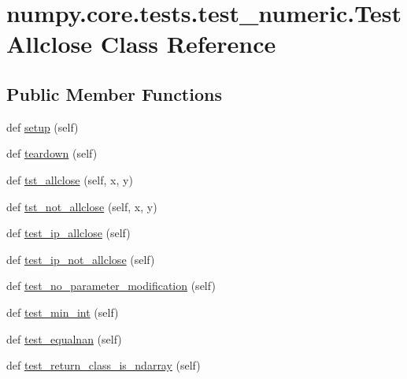 \hypertarget{classnumpy_1_1core_1_1tests_1_1test__numeric_1_1TestAllclose}{}\section{numpy.\+core.\+tests.\+test\+\_\+numeric.\+Test\+Allclose Class Reference}
\label{classnumpy_1_1core_1_1tests_1_1test__numeric_1_1TestAllclose}
\subsection*{Public Member Functions}
\begin{DoxyCompactItemize}
\item 
def \hyperlink{classnumpy_1_1core_1_1tests_1_1test__numeric_1_1TestAllclose_a8c78f8d6160a96447d02fcac890f82d2}{setup} (self)
\item 
def \hyperlink{classnumpy_1_1core_1_1tests_1_1test__numeric_1_1TestAllclose_a77214152dba42bda59eb3bd5fd9747a7}{teardown} (self)
\item 
def \hyperlink{classnumpy_1_1core_1_1tests_1_1test__numeric_1_1TestAllclose_a0949d88e64f932791b718258bcca57a6}{tst\+\_\+allclose} (self, x, y)
\item 
def \hyperlink{classnumpy_1_1core_1_1tests_1_1test__numeric_1_1TestAllclose_a70671c1ddb81c6b88dd7a5a696c2e952}{tst\+\_\+not\+\_\+allclose} (self, x, y)
\item 
def \hyperlink{classnumpy_1_1core_1_1tests_1_1test__numeric_1_1TestAllclose_a19ed607d9104efb000061e8bf5d81d66}{test\+\_\+ip\+\_\+allclose} (self)
\item 
def \hyperlink{classnumpy_1_1core_1_1tests_1_1test__numeric_1_1TestAllclose_ae4fb21d5adea3b067b390c970083ef48}{test\+\_\+ip\+\_\+not\+\_\+allclose} (self)
\item 
def \hyperlink{classnumpy_1_1core_1_1tests_1_1test__numeric_1_1TestAllclose_a474fc3b8bde0c995ac230d0711bd9411}{test\+\_\+no\+\_\+parameter\+\_\+modification} (self)
\item 
def \hyperlink{classnumpy_1_1core_1_1tests_1_1test__numeric_1_1TestAllclose_ae6ae842ada3148b145231e9cc2617438}{test\+\_\+min\+\_\+int} (self)
\item 
def \hyperlink{classnumpy_1_1core_1_1tests_1_1test__numeric_1_1TestAllclose_a316b0e687dad5ca3df96e04dcf26ef90}{test\+\_\+equalnan} (self)
\item 
def \hyperlink{classnumpy_1_1core_1_1tests_1_1test__numeric_1_1TestAllclose_ab5ebcee65226e65ea478eb20d411422d}{test\+\_\+return\+\_\+class\+\_\+is\+\_\+ndarray} (self)
\end{DoxyCompactItemize}

